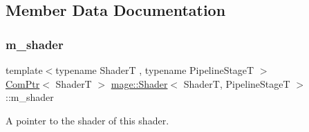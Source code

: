 \subsection{Member Data Documentation}
\hypertarget{classmage_1_1_shader_ac63260bdb25648451ddc1ee09d67c061}{}\label{classmage_1_1_shader_ac63260bdb25648451ddc1ee09d67c061} 
\subsubsection{\texorpdfstring{m\+\_\+shader}{m\_shader}}
{\footnotesize\ttfamily template$<$typename ShaderT , typename Pipeline\+StageT $>$ \\
\hyperlink{namespacemage_ae74f374780900893caa5555d1031fd79}{Com\+Ptr}$<$ ShaderT $>$ \hyperlink{classmage_1_1_shader}{mage\+::\+Shader}$<$ ShaderT, Pipeline\+StageT $>$\+::m\+\_\+shader\hspace{0.3cm}{\ttfamily [private]}}

A pointer to the shader of this shader. 